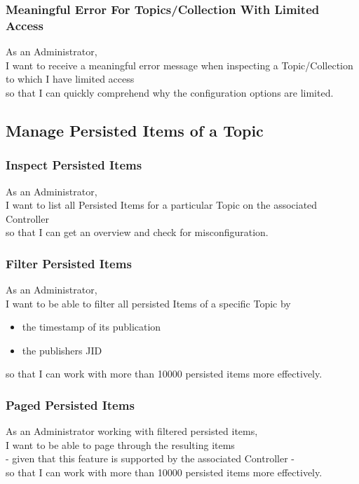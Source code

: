 \subsubsection{Meaningful Error For Topics/Collection With Limited Access}

As an Administrator,\\
I want to receive a meaningful error message when inspecting a Topic/Collection to which I have limited access \\
so that I can quickly comprehend why the configuration options are limited.

\subsection{Manage Persisted Items of a Topic}\label{sec:manage-persisted-items}
\subsubsection{Inspect Persisted Items}

As an Administrator,\\
I want to list all Persisted Items for a particular Topic on the associated Controller \\
so that I can get an overview and check for misconfiguration.

\subsubsection{Filter Persisted Items}\label{sec:requirement-filter-persisted-items}

As an Administrator,\\
I want to be able to filter all persisted Items of a specific Topic by \\
\begin{itemize}
    \item the timestamp of its publication
    \item the publishers JID
\end{itemize}
so that I can work with more than 10000 persisted items more effectively.

\subsubsection{Paged Persisted Items}\label{sec:paged-persisted-items}
As an Administrator working with filtered persisted items,\\
I want to be able to page through the resulting items\\
- given that this feature is supported by the associated Controller -\\
so that I can work with more than 10000 persisted items more effectively.

